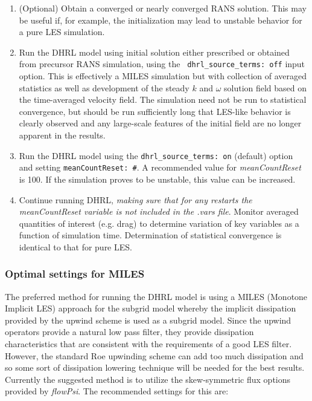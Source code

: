 \begin{enumerate}
\item (Optional) Obtain a converged or nearly converged RANS
  solution. This may be useful if, for example, the initialization may
  lead to unstable behavior for a pure LES simulation.

\item Run the DHRL model using initial solution either prescribed or
  obtained from precursor RANS simulation, using the {\tt
    dhrl\_source\_terms: off} input option. This is effectively a
  MILES simulation but with collection of averaged statistics as well
  as development of the steady $k$ and $\omega$ solution field based
  on the time-averaged velocity field. The simulation need not be run
  to statistical convergence, but should be run sufficiently long that
  LES-like behavior is clearly observed and any large-scale features
  of the initial field are no longer apparent in the results.

\item Run the DHRL model using the {\tt dhrl\_source\_terms: on}
  (default) option and setting {\tt meanCountReset: \#}. A recommended
  value for {\it meanCountReset} is 100. If the simulation proves to
  be unstable, this value can be increased.

\item Continue running DHRL, {\it making sure that for any restarts
  the meanCountReset variable is not included in the .vars
  file}. Monitor averaged quantities of interest (e.g. drag) to
  determine variation of key variables as a function of simulation
  time. Determination of statistical convergence is identical to that
  for pure LES.
\end{enumerate}

\subsubsection{Optimal settings for MILES}

The preferred method for running the DHRL model is using a MILES
(Monotone Implicit LES) approach for the subgrid model whereby the
implicit dissipation provided by the upwind scheme is used as a
subgrid model. Since the upwind operators provide a natural low pass
filter, they provide dissipation characteristics that are consistent
with the requirements of a good LES filter.  However, the standard Roe
upwinding scheme can add too much dissipation and so some sort of
dissipation lowering technique will be needed for the best results.
Currently the suggested method is to utilize the skew-symmetric flux
options provided by {\it flowPsi}.  The recommended settings for this are:

